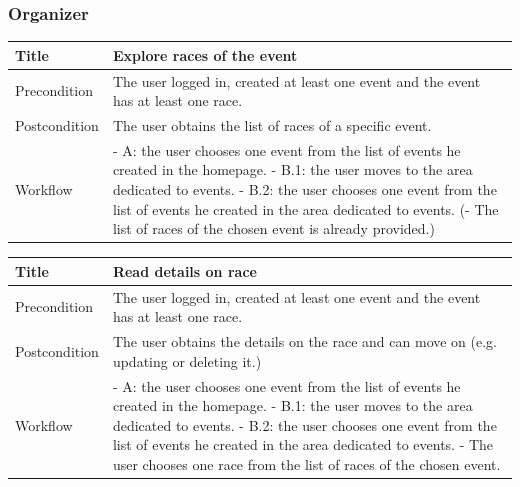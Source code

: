 \documentclass{beamer}
\begin{document}
\begin{frame}
    \frametitle{Organizer}
    \begin{table}
        \tiny
        \begin{tabular}{|p{2cm}|p{6cm}|}
        \hline
        Title & \textbf{Explore races of the event} \\
        \hline
        Precondition & The user logged in, created at least one event and the event has at least one race. \\
        \hline
        Postcondition & The user obtains the list of races of a specific event. \\
        \hline
        Workflow &
        - A: the user chooses one event from the list of events he created in the homepage. \newline
        - B.1: the user moves to the area dedicated to events. \newline
        - B.2: the user chooses one event from the list of events he created in the area dedicated to events. \newline
        (- The list of races of the chosen event is already provided.) \\
        \hline
        \end{tabular}
\end{table}

\begin{table}
    \tiny
    \begin{tabular}{|p{2cm}|p{6cm}|}
    \hline
    Title & \textbf{Read details on race} \\
    \hline
    Precondition & The user logged in, created at least one event and the event has at least one race. \\
    \hline
    Postcondition & The user obtains the details on the race and can move on (e.g. updating or deleting it.) \\
    \hline
    Workflow &
    - A: the user chooses one event from the list of events he created in the homepage. \newline
    - B.1: the user moves to the area dedicated to events. \newline
    - B.2: the user chooses one event from the list of events he created in the area dedicated to events. \newline
    - The user chooses one race from the list of races of the chosen event. \\
    \hline
    \end{tabular}
\end{table}

\end{frame}
\end{document}
